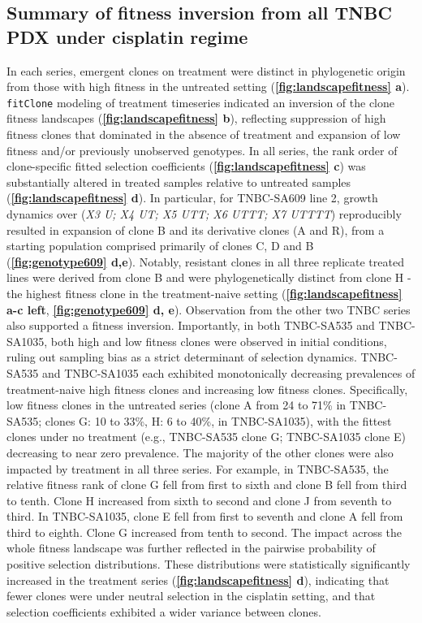 \subsection{Summary of fitness inversion from all TNBC PDX under cisplatin regime}
In each series, emergent clones on treatment were distinct in phylogenetic origin from those with high fitness in the untreated setting (\textbf{\autoref{fig:landscapefitness} a}). \texttt{fitClone} modeling of treatment timeseries indicated an inversion of the clone fitness landscapes (\textbf{\autoref{fig:landscapefitness} b}), reflecting suppression of high fitness clones that dominated in the absence of treatment and expansion of low fitness and/or previously unobserved genotypes. In all series, the rank order of clone-specific fitted selection coefficients (\textbf{\autoref{fig:landscapefitness} c}) was substantially altered in treated samples relative to untreated samples (\textbf{\autoref{fig:landscapefitness} d}). In particular, for TNBC-SA609 line 2, growth dynamics over (\textit{X3 U; X4 UT; X5 UTT; X6 UTTT; X7 UTTTT}) reproducibly resulted in expansion of clone B and its derivative clones (A and R), from a starting population comprised primarily of clones C, D and B (\textbf{\autoref{fig:genotype609} d,e}). Notably, resistant clones in all three replicate treated lines were derived from clone B and were phylogenetically distinct from clone H - the highest fitness clone in the treatment-naive setting  (\textbf{\autoref{fig:landscapefitness} a-c left}, \textbf{\autoref{fig:genotype609} d, e}). Observation from the other two TNBC series also supported a fitness inversion. Importantly, in both TNBC-SA535 and TNBC-SA1035, both high and low fitness clones were observed in initial conditions, ruling out sampling bias as a strict determinant of selection dynamics. TNBC-SA535 and TNBC-SA1035 each exhibited monotonically decreasing prevalences of treatment-naive high fitness clones and increasing low fitness clones. Specifically, low fitness clones in the untreated series (clone A from 24 to 71\% in TNBC-SA535; clones G: 10 to 33\%, H: 6 to 40\%, in TNBC-SA1035), with the fittest clones under no treatment (e.g., TNBC-SA535 clone G; TNBC-SA1035 clone E) decreasing to near zero prevalence. The majority of the other clones were also impacted by treatment in all three series. For example, in TNBC-SA535, the relative fitness rank of clone G fell from first to sixth and clone B fell from third to tenth. Clone H increased from sixth to second and clone J from seventh to third. In TNBC-SA1035, clone E fell from first to seventh and clone A fell from third to eighth. Clone G increased from tenth to second. The impact across the whole fitness landscape was further reflected in the pairwise probability of positive selection distributions. These distributions were statistically significantly increased in the treatment series  (\textbf{\autoref{fig:landscapefitness} d}), indicating that fewer clones were under neutral selection in the cisplatin setting, and that selection coefficients exhibited a wider variance between clones. 
